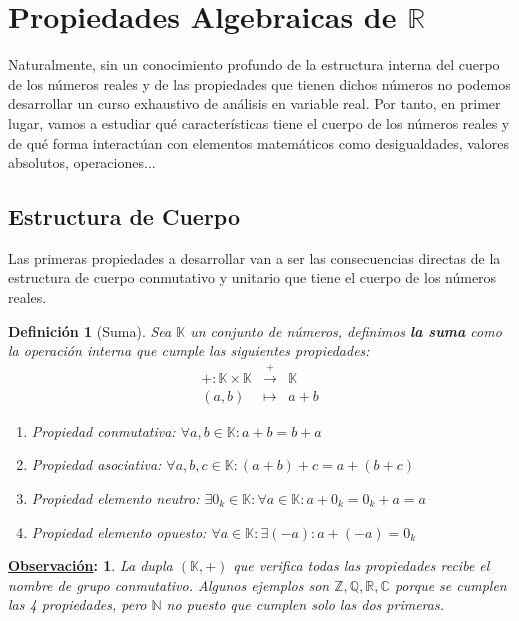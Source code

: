 \documentclass[10pt,a4paper,openright]{book}
\theoremstyle{break}
\newtheorem*{defi}{Definición}
\newtheorem*{obs}{\underline{Observación}:}
\begin{document}
\section{Propiedades Algebraicas de $\mathbb R$}
Naturalmente, sin un conocimiento profundo de la estructura interna del cuerpo de los números reales y de las propiedades que tienen dichos números no podemos desarrollar un curso exhaustivo de análisis en variable real. Por tanto, en primer lugar, vamos a estudiar qué características tiene el cuerpo de los números reales y de qué forma interactúan con elementos matemáticos como desigualdades, valores absolutos, operaciones...

\subsection{Estructura de Cuerpo}
Las primeras propiedades a desarrollar van a ser las consecuencias directas de la estructura de cuerpo conmutativo y unitario que tiene el cuerpo de los números reales.

\begin{defi}[Suma]
Sea $\mathbb K$ un conjunto de números, definimos \textbf{la suma} como la operación interna que cumple las siguientes propiedades:
\begin{eqnarray*}
+: \mathbb K \times\mathbb K & \stackrel{+}{\rightarrow} & \mathbb K \\
(a,b) & \longmapsto  & a+b
\end{eqnarray*}
\begin{enumerate}
\item Propiedad conmutativa: $\forall a, b \in \mathbb K: a+b=b+a$
\item Propiedad asociativa: $\forall a, b, c\in \mathbb K : (a+b)+c=a+(b+c)$
\item Propiedad elemento neutro: $\exists 0_k\in \mathbb K : \forall a \in \mathbb K : a+0_k=0_k+a=a$
\item Propiedad elemento opuesto: $\forall a \in \mathbb K : \exists (-a) : a+(-a)=0_k$
\end{enumerate}
\end{defi}

\begin{obs}
La dupla $(\mathbb K, +)$ que verifica todas las propiedades recibe el nombre de grupo conmutativo. Algunos ejemplos son $\mathbb {Z, Q, R, C}$ porque se cumplen las 4 propiedades, pero $\mathbb N$ no puesto que cumplen solo las dos primeras.
\end{obs}
\end{document}
